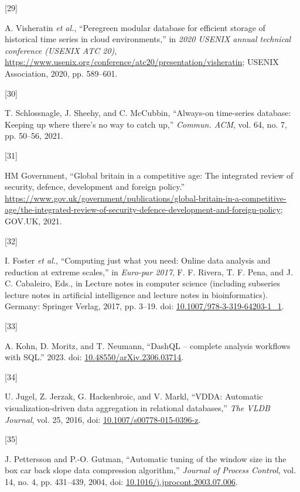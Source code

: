 \documentclass{article}
\newlength{\cslhangindent}
\newlength{\csllabelwidth}
\newlength{\cslentryspacingunit} %
\newenvironment{CSLReferences}[2] %
 {%
  \setlength{\parindent}{0pt}
  \ifodd #1
  \let\oldpar\par
  \def\par{\hangindent=\cslhangindent\oldpar}
  \fi
  \setlength{\parskip}{#2\cslentryspacingunit}
 }%
 {}
\newcommand{\CSLLeftMargin}[1]{\parbox[t]{\csllabelwidth}{#1}}
\newcommand{\CSLRightInline}[1]{\parbox[t]{\linewidth - \csllabelwidth}{#1}\break}
\begin{document}
\begin{CSLReferences}{0}{0}
\leavevmode{}%
\CSLLeftMargin{{[}29{]} }
\CSLRightInline{A. Visheratin \emph{et al.}, {``Peregreen {\textendash}
modular database for efficient storage of historical time series in
cloud environments,''} in \emph{2020 USENIX annual technical conference
(USENIX ATC 20)},
\url{https://www.usenix.org/conference/atc20/presentation/visheratin};
USENIX Association, 2020, pp. 589--601.}

\leavevmode{}%
\CSLLeftMargin{{[}30{]} }
\CSLRightInline{T. Schlossnagle, J. Sheehy, and C. McCubbin,
{``Always-on time-series database: Keeping up where there's no way to
catch up,''} \emph{Commun. ACM}, vol. 64, no. 7, pp. 50--56, 2021.}

\leavevmode{}%
\CSLLeftMargin{{[}31{]} }
\CSLRightInline{HM Government, {``Global britain in a competitive age:
The integrated review of security, defence, development and foreign
policy.''}
\url{https://www.gov.uk/government/publications/global-britain-in-a-competitive-age/the-integrated-review-of-security-defence-development-and-foreign-policy};
GOV.UK, 2021.}

\leavevmode{}%
\CSLLeftMargin{{[}32{]} }
\CSLRightInline{I. Foster \emph{et al.}, {``Computing just what you
need: Online data analysis and reduction at extreme scales,''} in
\emph{Euro-par 2017}, F. F. Rivera, T. F. Pena, and J. C. Cabaleiro,
Eds., in Lecture notes in computer science (including subseries lecture
notes in artificial intelligence and lecture notes in bioinformatics).
Germany: Springer Verlag, 2017, pp. 3--19. doi:
\href{https://doi.org/10.1007/978-3-319-64203-1_1}{10.1007/978-3-319-64203-1\_1}.}

\leavevmode{}%
\CSLLeftMargin{{[}33{]} }
\CSLRightInline{A. Kohn, D. Moritz, and T. Neumann, {``DashQL --
complete analysis workflows with SQL.''} 2023. doi:
\href{https://doi.org/10.48550/arXiv.2306.03714}{10.48550/arXiv.2306.03714}.}

\leavevmode{}%
\CSLLeftMargin{{[}34{]} }
\CSLRightInline{U. Jugel, Z. Jerzak, G. Hackenbroic, and V. Markl,
{``VDDA: Automatic visualization-driven data aggregation in relational
databases,''} \emph{The VLDB Journal}, vol. 25, 2016, doi:
\href{https://doi.org/10.1007/s00778-015-0396-z}{10.1007/s00778-015-0396-z}.}

\leavevmode{}%
\CSLLeftMargin{{[}35{]} }
\CSLRightInline{J. Pettersson and P.-O. Gutman, {``Automatic tuning of
the window size in the box car back slope data compression algorithm,''}
\emph{Journal of Process Control}, vol. 14, no. 4, pp. 431--439, 2004,
doi:
\href{https://doi.org/10.1016/j.jprocont.2003.07.006}{10.1016/j.jprocont.2003.07.006}.}


\end{CSLReferences}
\end{document}
